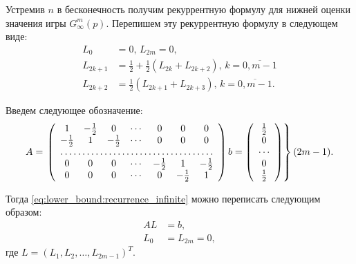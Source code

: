 Устремив $ n $ в бесконечность получим рекуррентную формулу для нижней оценки значения игры $ G_\infty^m(p) $. Перепишем эту рекуррентную формулу в следующем виде:
\begin{equation}
\label{eq:lower_bound:recurrence_infinite}
\begin{aligned}
L_0 &= 0,\, L_{2m} = 0, \\
L_{2k + 1} &= \frac{1}{2} + \frac{1}{2} (L_{2k} + L_{2k + 2}), \, 
    k = \overline{0,m-1}\\
L_{2k + 2} &= \frac{1}{2} (L_{2k + 1} + L_{2k + 3}), \, 
    k = \overline{0,m-1}.
\end{aligned}
\end{equation}

Введем следующее обозначение:
\begin{equation}
A = \left.
\left(\begin{array}{ccccccc}
    1 & -\frac{1}{2} & 0 & \cdots & 0 & 0 & 0 \\
    -\frac{1}{2} & 1 & -\frac{1}{2} & \cdots & 0 & 0 & 0 \\
    \hdotsfor{7} \\
    0 & 0 & 0 & \cdots & -\frac{1}{2} & 1 & -\frac{1}{2} \\
    0 & 0 & 0 & \cdots & 0 & -\frac{1}{2} & 1 \\
\end{array}\right)
b = \left(\begin{array}{c}
\frac{1}{2} \\
0\\
\cdots\\
0 \\
\frac{1}{2}
\end{array}\right)
\right\} (2m - 1).
\end{equation}


Тогда \eqref{eq:lower_bound:recurrence_infinite} можно переписать следующим образом:
\[
\begin{aligned}
AL &= b, \\
L_0 &= L_{2m} = 0,
\end{aligned}
\]
где $ L = (L_1, L_2, \ldots, L_{2m-1})^T $.

